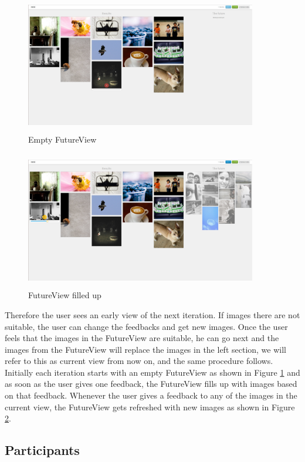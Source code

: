 \documentclass[english]{tktltiki}
\begin{document}
\begin{figure}[h!]
  \centering
    \includegraphics[width=0.90\textwidth,height=6cm]{figures/future_sample_1.jpg}
    \caption{Empty FutureView}
    \label{fut_samp_1}
\end{figure}

\begin{figure}[h!]
  \centering
    \includegraphics[width=0.90\textwidth,height=6cm]{figures/future_sample_2.jpg}
    \caption{FutureView filled up}
    \label{fut_samp_2}
\end{figure}

Therefore the user sees an early view of the next iteration. If images there are not suitable, the user can change the feedbacks and get new images. Once the user feels that the images in the FutureView are suitable, he can go next and the images from the FutureView will replace the images in the left section, we will refer to this as current view from now on, and the same procedure follows. Initially each iteration starts with an empty FutureView as shown in Figure \ref{fut_samp_1} and as soon as the user gives one feedback, the FutureView fills up with images based on that feedback. Whenever the user gives a feedback to any of the images in the current view, the FutureView gets refreshed with new images as shown in Figure \ref{fut_samp_2}.

\subsection{Participants}
\end{document}
